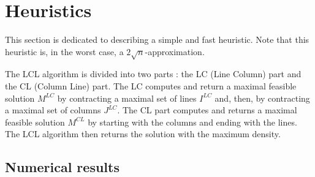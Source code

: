 
\section{Heuristics}
\label{sect:heuristics}

\begin{comment}
\begin{itemize}
\item Avant toute chose tester Greedy VS LCL VS Neighborization sur des grosses instances (jusqu'à combien va le LCL?).
\item Présenter ceux qui marchent et ceux qui marchent pas
\item Contreexemple? Explication rapide du pire cas?
\end{itemize}
\end{comment}

This section is dedicated to describing a simple and fast heuristic. Note that this heuristic is, in the worst case, a $2\sqrt{n}$-approximation.

The LCL algorithm is divided into two parts : the LC (Line Column) part and the CL (Column Line) part. The LC computes and return a maximal feasible solution $M^{LC}$ by contracting a maximal set of lines $I^{LC}$ and, then, by contracting a maximal set of columns $J^{LC}$. The CL part computes and returns a maximal feasible solution $M^{CL}$ by starting with the columns and ending with the lines. The LCL algorithm then returns the solution with the maximum density.


\subsection{Numerical results}

